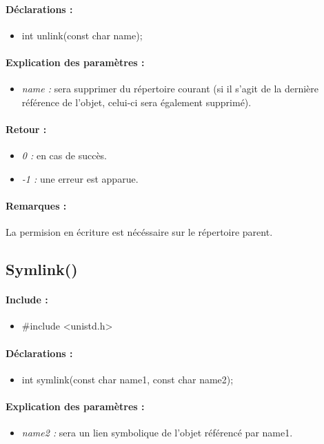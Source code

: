 \documentclass{article}[12pt]
\begin{document}
\paragraph{Déclarations : }
\begin{itemize}
	\item int unlink(const char \* name);
\end{itemize}
\paragraph{Explication des paramètres : }
\begin{itemize}
	\item \emph{name : } sera supprimer du répertoire courant (si il s'agit de la dernière référence de l'objet, celui-ci sera également supprimé).
\end{itemize}
\paragraph{Retour : }
\begin{itemize}
	\item \emph{0 : } en cas de succès.
	\item \emph{-1 : } une erreur est apparue.
\end{itemize}
\paragraph{Remarques : }
La permision en écriture est nécéssaire sur le répertoire parent. 
\subsection{Symlink()}
\paragraph{Include : }
\begin{itemize}
	\item \#include <unistd.h>
\end{itemize}
\paragraph{Déclarations : }
\begin{itemize}
	\item int symlink(const char \* name1, const char \* name2);
\end{itemize}
\paragraph{Explication des paramètres : }
\begin{itemize}
	\item \emph{name2 : } sera un lien symbolique de l'objet référencé par name1.
\end{itemize}
\end{document}
